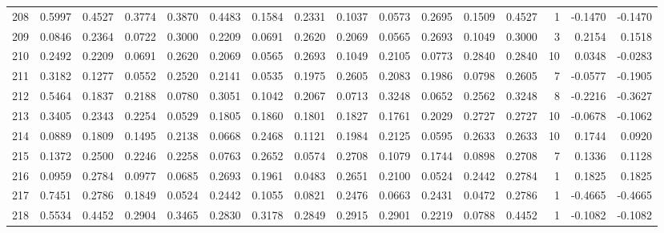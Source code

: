\begin{tabular}{lrrrrrrrrrrrrrrr}
208 &      0.5997 &  0.4527 &  0.3774 &  0.3870 &  0.4483 &  0.1584 &  0.2331 &  0.1037 &  0.0573 &  0.2695 &   0.1509 &     0.4527 &      1 &                   -0.1470 &                    -0.1470 \\
209 &      0.0846 &  0.2364 &  0.0722 &  0.3000 &  0.2209 &  0.0691 &  0.2620 &  0.2069 &  0.0565 &  0.2693 &   0.1049 &     0.3000 &      3 &                    0.2154 &                     0.1518 \\
210 &      0.2492 &  0.2209 &  0.0691 &  0.2620 &  0.2069 &  0.0565 &  0.2693 &  0.1049 &  0.2105 &  0.0773 &   0.2840 &     0.2840 &     10 &                    0.0348 &                    -0.0283 \\
211 &      0.3182 &  0.1277 &  0.0552 &  0.2520 &  0.2141 &  0.0535 &  0.1975 &  0.2605 &  0.2083 &  0.1986 &   0.0798 &     0.2605 &      7 &                   -0.0577 &                    -0.1905 \\
212 &      0.5464 &  0.1837 &  0.2188 &  0.0780 &  0.3051 &  0.1042 &  0.2067 &  0.0713 &  0.3248 &  0.0652 &   0.2562 &     0.3248 &      8 &                   -0.2216 &                    -0.3627 \\
213 &      0.3405 &  0.2343 &  0.2254 &  0.0529 &  0.1805 &  0.1860 &  0.1801 &  0.1827 &  0.1761 &  0.2029 &   0.2727 &     0.2727 &     10 &                   -0.0678 &                    -0.1062 \\
214 &      0.0889 &  0.1809 &  0.1495 &  0.2138 &  0.0668 &  0.2468 &  0.1121 &  0.1984 &  0.2125 &  0.0595 &   0.2633 &     0.2633 &     10 &                    0.1744 &                     0.0920 \\
215 &      0.1372 &  0.2500 &  0.2246 &  0.2258 &  0.0763 &  0.2652 &  0.0574 &  0.2708 &  0.1079 &  0.1744 &   0.0898 &     0.2708 &      7 &                    0.1336 &                     0.1128 \\
216 &      0.0959 &  0.2784 &  0.0977 &  0.0685 &  0.2693 &  0.1961 &  0.0483 &  0.2651 &  0.2100 &  0.0524 &   0.2442 &     0.2784 &      1 &                    0.1825 &                     0.1825 \\
217 &      0.7451 &  0.2786 &  0.1849 &  0.0524 &  0.2442 &  0.1055 &  0.0821 &  0.2476 &  0.0663 &  0.2431 &   0.0472 &     0.2786 &      1 &                   -0.4665 &                    -0.4665 \\
218 &      0.5534 &  0.4452 &  0.2904 &  0.3465 &  0.2830 &  0.3178 &  0.2849 &  0.2915 &  0.2901 &  0.2219 &   0.0788 &     0.4452 &      1 &                   -0.1082 &                    -0.1082 \\

\end{tabular}
